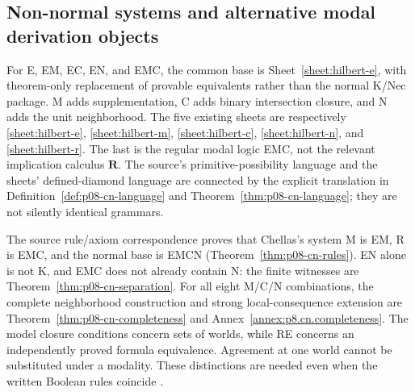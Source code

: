 \subsection{Non-normal systems and alternative modal derivation objects}

For E, EM, EC, EN, and EMC, the common base is
Sheet~\ref{sheet:hilbert-e}, with theorem-only replacement of provable
equivalents rather than the normal K/Nec package.  M adds supplementation,
C adds binary intersection closure, and N adds the unit neighborhood.  The
five existing sheets are respectively
\ref{sheet:hilbert-e}, \ref{sheet:hilbert-m}, \ref{sheet:hilbert-c},
\ref{sheet:hilbert-n}, and \ref{sheet:hilbert-r}.  The last is the regular
modal logic EMC, not the relevant implication calculus \(\mathbf R\).
The source's primitive-possibility language and the sheets' defined-diamond
language are connected by the explicit translation in
Definition~\ref{def:p08-cn-language} and
Theorem~\ref{thm:p08-cn-language}; they are not silently identical grammars.

The source rule/axiom correspondence proves that Chellas's system M is EM,
R is EMC, and the normal base is EMCN
(Theorem~\ref{thm:p08-cn-rules}).  EN alone is not K, and EMC does not already
contain N: the finite witnesses are
Theorem~\ref{thm:p08-cn-separation}.  For all eight M/C/N combinations, the
complete neighborhood construction and strong local-consequence extension
are Theorem~\ref{thm:p08-cn-completeness} and
Annex~\ref{annex:p8.cn.completeness}.  The model closure conditions concern
sets of worlds, while RE concerns an independently proved formula
equivalence.  Agreement at one world cannot be substituted under a modality.
These distinctions are needed even when the written Boolean rules coincide
\cite[chaps.~7--9]{Chellas1980}.


